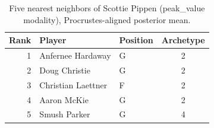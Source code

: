 \begin{table}[htbp]
  \centering\small
  \begin{tabular}{rllc}
    \toprule
    Rank & Player & Position & Archetype \\
    \midrule
    1 & Anfernee Hardaway & G & 2 \\
    2 & Doug Christie & G & 2 \\
    3 & Christian Laettner & F & 2 \\
    4 & Aaron McKie & G & 2 \\
    5 & Smush Parker & G & 4 \\
    \bottomrule
  \end{tabular}
  \caption{Five nearest neighbors of Scottie Pippen (peak_value modality), Procrustes-aligned posterior mean.}
  \label{tab:Scottie_Pippen_neighbors_peak_value}
\end{table}

